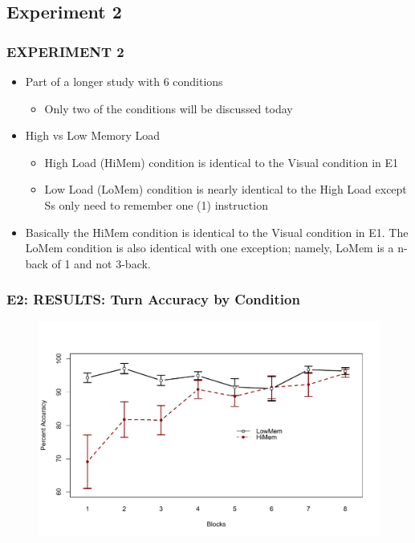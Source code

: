 \documentclass{beamer}
\begin{document}
\subsection{Experiment 2}


\begin{frame} 
	\frametitle{EXPERIMENT 2}
	\begin{itemize}
		\item Part of a longer study with 6 conditions
		\begin{itemize}
			\item Only two of the conditions will be discussed today
		\end{itemize}
		\item High vs Low Memory Load 
		\begin{itemize}
			\item High Load (HiMem) condition is identical to the Visual condition in E1
			\item Low Load (LoMem) condition is nearly identical to the High Load except Ss only need to remember one (1) instruction 
		\end{itemize}
		\item Basically the HiMem condition is identical to the Visual condition in E1. The LoMem condition is also identical with one exception; namely, LoMem is a \alert{n-back} of \alert{1} and not 3-back.
  	\end{itemize}
\end{frame}

\begin{frame}
	\frametitle{E2: RESULTS: Turn Accuracy by Condition}
	\vspace{-1.25cm}
	\begin{figure}
		\centering
		\includegraphics[width=.9\textwidth]{../zNvBkFigs/Rplot-E2Acc-LineChrt}
	\end{figure}
\end{frame}
\end{document}
